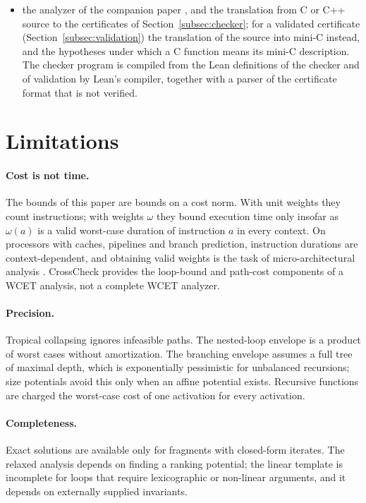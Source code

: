 \documentclass[oneside,english]{amsart}
\numberwithin{equation}{section}
\numberwithin{figure}{section}
\theoremstyle{plain}
\theoremstyle{definition}
\theoremstyle{plain}
\theoremstyle{remark}
\theoremstyle{plain}
\theoremstyle{definition}
\theoremstyle{plain}
\theoremstyle{remark}
\begin{document}
\begin{itemize}
    \item the analyzer of the companion paper \cite{crosscheckTool}, and the translation from C or C++ source to the certificates of Section~\ref{subsec:checker}; for a validated certificate (Section~\ref{subsec:validation}) the translation of the source into mini-C instead, and the hypotheses under which a C function means its mini-C description. The checker program is compiled from the Lean definitions of the checker and of validation by Lean's compiler, together with a parser of the certificate format that is not verified.
\end{itemize}

\section{Limitations}
\label{sec:limitations}

\paragraph{Cost is not time.}
The bounds of this paper are bounds on a cost norm. With unit weights they count instructions; with weights $\omega$ they bound execution time only insofar as $\omega(a)$ is a valid worst-case duration of instruction $a$ in every context. On processors with caches, pipelines and branch prediction, instruction durations are context-dependent, and obtaining valid weights is the task of micro-architectural analysis \cite{wilhelm2008worst}. CrossCheck provides the loop-bound and path-cost components of a WCET analysis, not a complete WCET analyzer.

\paragraph{Precision.}
Tropical collapsing ignores infeasible paths. The nested-loop envelope is a product of worst cases without amortization. The branching envelope assumes a full tree of maximal depth, which is exponentially pessimistic for unbalanced recursions; size potentials avoid this only when an affine potential exists. Recursive functions are charged the worst-case cost of one activation for every activation.

\paragraph{Completeness.}
Exact solutions are available only for fragments with closed-form iterates. The relaxed analysis depends on finding a ranking potential; the linear template is incomplete for loops that require lexicographic or non-linear arguments, and it depends on externally supplied invariants.
\end{document}
